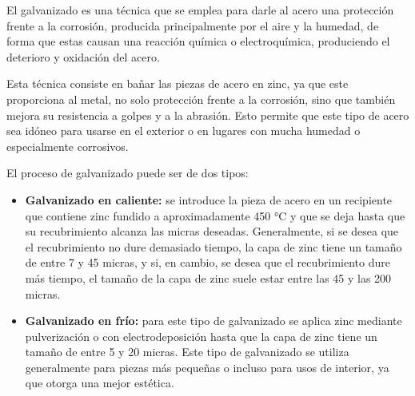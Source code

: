 
El galvanizado \cite{ferrosplanes} es una técnica que se emplea para darle al acero una protección frente a la corrosión, producida principalmente por el aire y la humedad, de forma que estas causan una reacción química o electroquímica, produciendo el deterioro y oxidación del acero. 

Esta técnica consiste en bañar las piezas de acero en zinc, ya que este proporciona al metal, no solo protección frente a la corrosión, sino que también mejora su resistencia a golpes y a la abrasión. Esto permite que este tipo de acero sea idóneo para usarse en el exterior o en lugares con mucha humedad o especialmente corrosivos.

El proceso de galvanizado puede ser de dos tipos:
\begin{itemize}
    \item \textbf{Galvanizado en caliente:} se introduce la pieza de acero en un recipiente que contiene zinc fundido a aproximadamente 450 °C y que se deja hasta que su recubrimiento alcanza las micras deseadas. Generalmente, si se desea que el recubrimiento no dure demasiado tiempo, la capa de zinc tiene un tamaño de entre 7 y 45 micras, y si, en cambio, se desea que el recubrimiento dure más tiempo, el tamaño de la capa de zinc suele estar entre las 45 y las 200 micras.
    \item \textbf{Galvanizado en frío:} para este tipo de galvanizado se aplica zinc mediante pulverización o con electrodeposición hasta que la capa de zinc tiene un tamaño de entre 5 y 20 micras. Este tipo de galvanizado se utiliza generalmente para piezas más pequeñas o incluso para usos de interior, ya que otorga una mejor estética. 
\end{itemize}

